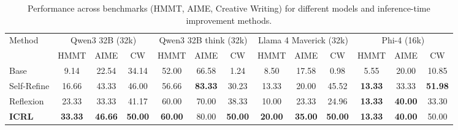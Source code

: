 \documentclass{article} %
\newcommand{\am}[1]{({\color{magenta}Amir: #1})}
\newcommand{\0}{\mathbf{0}}
\begin{document}






\begin{table}[t]
  \centering
  \small
  \setlength{\tabcolsep}{2.5pt} %
  \renewcommand{\arraystretch}{1.3} %
  \caption{Performance across benchmarks (HMMT, AIME, Creative Writing) for different models and inference-time improvement methods.}
  \label{tab:icrl_results}
  \begin{tabular}{@{}l|ccc|ccc|ccc|ccc@{}}
    \toprule
    \multirow{2}{*}{Method} &
    \multicolumn{3}{c|}{Qwen3 32B (32k)} &
    \multicolumn{3}{c|}{Qwen3 32B think (32k)} &
    \multicolumn{3}{c|}{Llama 4 Maverick (32k)} &
    \multicolumn{3}{c}{Phi-4 (16k)} \\
    \cmidrule(lr){2-4}\cmidrule(lr){5-7}\cmidrule(lr){8-10}\cmidrule(lr){11-13}
    & HMMT & AIME & CW & HMMT & AIME & CW & HMMT & AIME & CW & HMMT & AIME & CW \\
    \midrule
    Base        & 9.14  & 22.54  & 34.14  & 52.00  & 66.58  & 1.24   & 8.50  & 17.58  & 0.98   & 5.55  & 20.00  & 10.85 \\
    Self-Refine & 16.66 & 43.33  & 46.00  & 56.66  & \textbf{83.33}  & 30.23  & 13.33 & 20.00  & 45.52  & \textbf{13.33} & 33.33  & \textbf{51.98} \\
    Reflexion   & 23.33 & 33.33  & 41.17  & 60.00  & 70.00  & 38.33  & 10.00 & 23.33  & 24.96  & \textbf{13.33} & \textbf{40.00}  & 33.30 \\
    \textbf{ICRL} & \textbf{33.33} & \textbf{46.66} & \textbf{50.00} &
    \textbf{60.00} & 80.00 & \textbf{50.00} &
    \textbf{20.00} & \textbf{35.00} & \textbf{50.00} &
    \textbf{13.33} & \textbf{40.00} & 50.00 \\
    \bottomrule
  \end{tabular}
\end{table}




\end{document}
